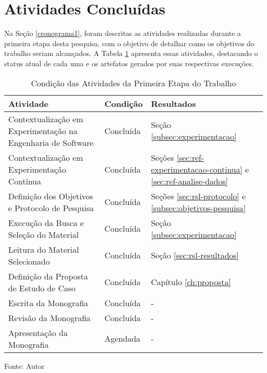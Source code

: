 \section{Atividades Concluídas}

Na Seção \ref{cronograma1}, foram descritas as atividades realizadas durante a primeira etapa desta pesquisa, com o objetivo de detalhar como os objetivos do trabalho seriam alcançados. A Tabela \ref{tab:atividades1} apresenta essas atividades, destacando o status atual de cada uma e os artefatos gerados por suas respectivas execuções.

\begin{table}[]
\centering
    \caption{Condição das Atividades da Primeira Etapa do Trabalho}
    \begin{tabular}{|p{8.5cm}|p{3cm}|p{3cm}|}
        \hline
        \textbf{Atividade} & \textbf{Condição} & \textbf{Resultados} \\ \hline
        Contextualização em Experimentação na Engenharia de Software & Concluída & Seção \ref{subsec:experimentacao} \\ \hline
        Contextualização em Experimentação Contínua & Concluída & Seções \ref{sec:ref-experimentacao-continua} e \ref{sec:ref-analise-dados} \\ \hline
        Definição dos Objetivos e Protocolo de Pesquisa & Concluída & Seções \ref{sec:rsl-protocolo} e \ref{subsec:objetivos-pesquisa} \\ \hline
        Execução da Busca e Seleção do Material & Concluída & Seção \ref{subsec:experimentacao} \\ \hline
        Leitura do Material Selecionado & Concluída & Seção \ref{sec:rsl-resultados} \\ \hline
        Definição da Proposta de Estudo de Caso & Concluída & Capítulo \ref{ch:proposta} \\ \hline
        Escrita da Monografia & Concluída & - \\ \hline
        Revisão da Monografia & Concluída & - \\ \hline
        Apresentação da Monografia & Agendada & - \\ \hline
    \end{tabular}

    \label{tab:atividades1}
    
    \begin{center}
        \text Fonte: Autor
    \end{center}
\end{table}
